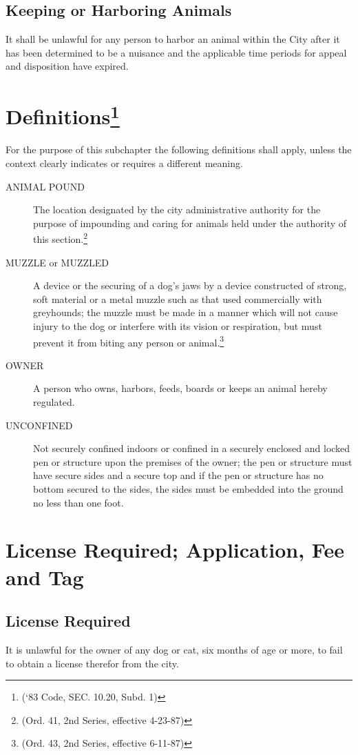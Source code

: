 \subsection{Keeping or Harboring Animals}
It shall be unlawful for any person to harbor an animal within the City after it has been determined to be a nuisance and the applicable time periods for appeal and disposition have expired.\\


\setcounter{section}{14}
\section{Definitions\footnote{(‘83 Code, SEC. 10.20, Subd. 1)}}
For the purpose of this subchapter the following definitions shall apply, unless the context clearly indicates or requires a different meaning.
\begin{description}
    \item[ANIMAL POUND] The location designated by the city administrative authority for the purpose of impounding and caring for animals held under the authority of this section.\footnote{(Ord. 41, 2nd Series, effective 4-23-87)}
    \item[MUZZLE or MUZZLED] A device or the securing of a dog’s jaws by a device constructed of strong, soft material or a metal muzzle such as that used commercially with greyhounds; the muzzle must be made in a manner which will not cause injury to the dog or interfere with its vision or respiration, but must prevent it from biting any person or animal.\footnote{(Ord. 43, 2nd Series, effective 6-11-87)}
    \item[OWNER] A person who owns, harbors, feeds, boards or keeps an animal hereby regulated.
    \item[UNCONFINED] Not securely confined indoors or confined in a securely enclosed and locked pen or structure upon the premises of the owner; the pen or structure must have secure sides and a secure top and if the pen or structure has no bottom secured to the sides, the sides must be embedded into the ground no less than one foot.
\end{description}

\section{License Required; Application, Fee and Tag}
\subsection{License Required}
It is unlawful for the owner of any dog or cat, six months of age or more, to fail to obtain a license therefor from the city.
